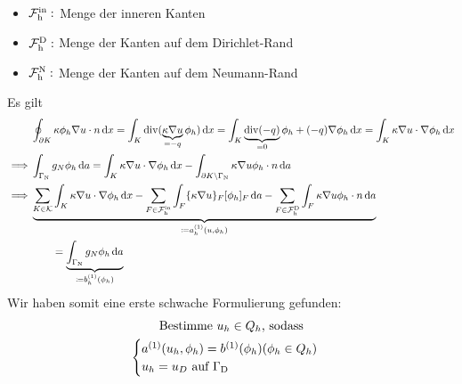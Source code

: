 \begin{notation}~
	\begin{itemize}
		\item $ \operatorname{\mathcal{F}_h^{\text{in}}}: $ Menge der inneren Kanten
		\item $ \operatorname{\mathcal{F}_h^{\text{D}}}: $ Menge der Kanten auf dem Dirichlet-Rand
		\item $ \operatorname{\mathcal{F}_h^{\text{N}}}: $ Menge der Kanten auf dem Neumann-Rand
	\end{itemize}
\end{notation}

Es gilt
\begin{align*}
	&\oint_{\partial K} \kappa \phi_h \nabla u \cdot n \diff x = \int_K \dive(\underbrace{\kappa \nabla u}_{= -q} \phi_h) \diff x = \int_K \underbrace{\dive(-q)}_{=0} \phi_h + (-q) \nabla \phi_h \diff x = \int_K \kappa \nabla u \cdot \nabla \phi_h \diff x\\
	\implies &\int_{\GammaN} g_N \phi_h \diff a = \int_K \kappa \nabla u \cdot \nabla \phi_h \diff x - \int_{\partial K \setminus \GammaN} \kappa \nabla u \phi_h \cdot n \diff a\\
	\implies &\underbrace{\sum_{K \in \mathcal{K}} \int_K \kappa \nabla u \cdot \nabla \phi_h \diff x - \sum_{F \in \FIn} \int_{F} \{\kappa \nabla u \}_F [\phi_h]_F \diff a - \sum_{F \in \FD} \int_{F} \kappa \nabla u \phi_h \cdot n \diff a}_{\coloneqq a^{(1)}_h(u,\phi_h)}\\
	&\qquad = \underbrace{\int_{\GammaN} g_N \phi_h \diff a}_{\coloneqq b^{(1)}_h(\phi_h)}\\
\end{align*}
Wir haben somit eine erste schwache Formulierung gefunden:
\begin{gather*}
\text{Bestimme } u_h \in Q_h \text{, sodass}\\
\begin{cases}
	a^{(1)}(u_h,\phi_h) = b^{(1)}(\phi_h) (\phi_h \in Q_h)\\
	u_h = u_D \text{ auf }\Gamma_{\text{D}}
\end{cases}
\end{gather*}

